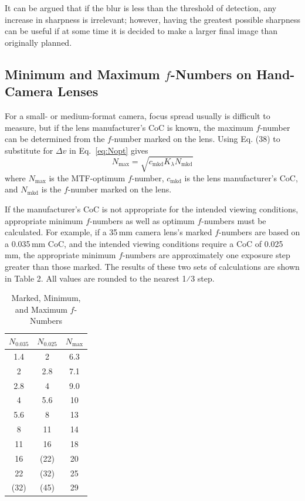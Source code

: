 \documentclass[11pt, oneside]{scrartcl}   	%
\newcommand{\Dv}{\ensuremath{\Delta v}}
\begin{document}
It can be argued that if the blur is less than the threshold of detection, any increase in sharpness is irrelevant; however, having the greatest possible sharpness can be useful if at some time it is decided to make a larger final image than originally planned.

\subsection{Minimum and Maximum $f$-Numbers on Hand-Camera Lenses}
\label{sec:min-max-f}

For a small- or medium-format camera, focus spread usually is difficult to measure, but if the lens manufacturer's CoC is known, the maximum $f$-number can be determined from the $f$-number marked on the lens. Using Eq. (38) to substitute for $\Dv$ in Eq.~\ref{eq:Nopt} gives
\begin{equation}
   N_\mathrm{max} = \sqrt{c_\mathrm{mkd}K_λ N_\mathrm{mkd}}
   \label{eq:Nmax2}
\end{equation}
where $N_\mathrm{max}$ is the MTF-optimum $f$-number, $c_\mathrm{mkd}$ is the lens manufacturer’s CoC, and $N_\mathrm{mkd}$ is the $f$-number marked on the lens.

If the manufacturer’s CoC is not appropriate for the intended viewing conditions, appropriate minimum $f$-numbers as well as optimum $f$-numbers must be calculated. For example, if a 35\,mm camera lens’s marked $f$-numbers are based on a 0.035\,mm CoC, and the intended viewing conditions require a CoC of 0.025\,mm, the appropriate minimum $f$-numbers are approximately one exposure step greater than those marked. The results of these two sets of calculations are shown in Table 2. All values are rounded to the nearest 1⁄3 step.

\begin{table}[htp]
\caption{Marked, Minimum, and Maximum $f$-Numbers}
\begin{center}
\label{tab:mmmf}
\begin{tabular}{ccc}
  \hline
 $N_{0.035}$ & $N_{0.025}$ & $N_\mathrm{max}$\\
  \hline
 1.4 & 2 & 6.3 \\ 
2 & 2.8 & 7.1 \\ 
2.8 & 4 & 9.0 \\ 
4 & 5.6 & 10 \\ 
5.6 & 8 & 13 \\ 
8 & 11 & 14 \\ 
11 & 16 & 18 \\ 
16 & (22) & 20 \\ 
22 & (32) & 25 \\ 
(32) & (45) & 29 \\ 
 \hline
\end{tabular}
\end{center}
\end{table}%
\end{document}
